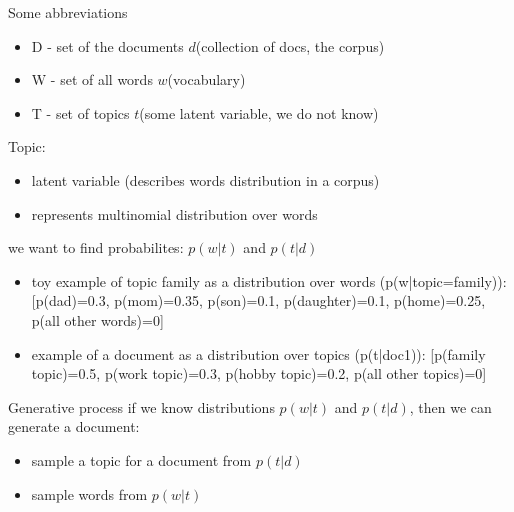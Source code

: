 \documentclass[svgnames]{beamer}
\begin{document}
    \begin{frame}{Some abbreviations}
        \begin{itemize}
            \item D - set of the documents $d$(collection of docs, the corpus)
            \item W - set of all words $w$(vocabulary)
            \item T - set of topics $t$(some latent variable, we do not know)
        \end{itemize}
        Topic:
        \begin{itemize}
            \item \alert{latent} variable (describes words distribution in a corpus)
            \item represents multinomial distribution over words
        \end{itemize}
        we want to find probabilites: $p(w|t)$ and $p(t|d)$

        \begin{itemize}
            \item   toy example of topic family as a distribution over words (p(w|topic=family)):
            [p(dad)=0.3, p(mom)=0.35, p(son)=0.1, p(daughter)=0.1, p(home)=0.25, p(all other words)=0]
            \item example of a document as a distribution over topics (p(t|doc1)):
            [p(family topic)=0.5, p(work topic)=0.3, p(hobby topic)=0.2, p(all other topics)=0]
        \end{itemize}

    \end{frame}

    \begin{frame}{Generative process}
        if we know distributions $p(w|t)$ and $p(t|d)$, then we can generate a document:
        \begin{itemize}
            \item sample a topic for a document from $p(t|d)$
            \item sample words from $p(w|t)$
        \end{itemize}
    \end{frame}
\end{document}
